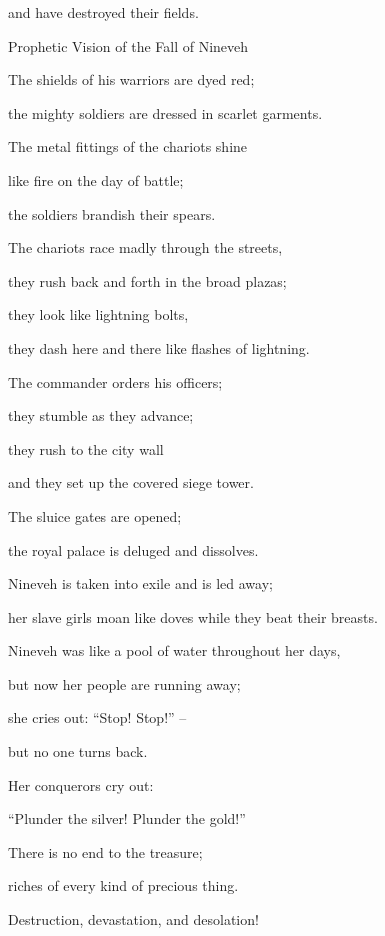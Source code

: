 {\par }{\Q and have destroyed
their fields.
\par }{\SH Prophetic Vision of the Fall of Nineveh
\par }{\Q {}The shields
of his warriors
are dyed red;
\par }{\Q the mighty
soldiers
are dressed in scarlet garments.
\par }{\Q The metal fittings
of the chariots
shine
\par }{\Q like fire
on the day
of battle;
\par }{\Q the soldiers brandish
their spears.
\par }{\Q {}The chariots
race madly
through the streets,
\par }{\Q they rush back and forth
in the broad plazas;
\par }{\Q they look like
lightning bolts,
\par }{\Q they dash here and there
like flashes of lightning.
\par }{\Q {}The commander orders
his officers;
\par }{\Q they stumble
as they advance;
\par }{\Q they rush
to the city wall
\par }{\Q and they set up
the covered siege tower.
\par }{\Q {}The sluice
gates
are opened;
\par }{\Q the royal palace
is deluged and dissolves.
\par }{\Q {}Nineveh
is taken into
exile
and is led away;
\par }{\Q her slave girls
moan
like doves
while they beat
their breasts.
\par }{\Q {}Nineveh
was like a pool
of water
throughout her days,
\par }{\Q but now her people are
running away;
\par }{\Q she cries out: “Stop! Stop!” –
\par }{\Q but no one turns back.
\par }{\Q {}Her conquerors cry out:

\par }{\Q “Plunder
the silver! Plunder
the gold!”
\par }{\Q There is no
end
to the treasure;
\par }{\Q riches
of every
kind of precious
thing.
\par }{\Q {}Destruction,
devastation,
and desolation!

}
